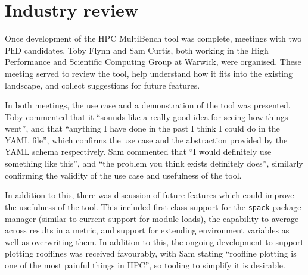 \section{Industry review}
\label{sec:hpc-multibench-industry-review}

Once development of the HPC MultiBench tool was complete, meetings with two PhD candidates, Toby Flynn and Sam Curtis, both working in the High Performance and Scientific Computing Group at Warwick, were organised. These meeting served to review the tool, help understand how it fits into the existing landscape, and collect suggestions for future features.

In both meetings, the use case and a demonstration of the tool was presented. Toby commented that it ``sounds like a really good idea for seeing how things went'', and that ``anything I have done in the past I think I could do in the YAML file'', which confirms the use case and the abstraction provided by the YAML schema respectively. Sam commented that ``I would definitely use something like this'', and ``the problem you think exists definitely does'', similarly confirming the validity of the use case and usefulness of the tool.

In addition to this, there was discussion of future features which could improve the usefulness of the tool. This included first-class support for the \texttt{spack} package manager (similar to current support for module loads), the capability to average across results in a metric, and support for extending environment variables as well as overwriting them. In addition to this, the ongoing development to support plotting rooflines was received favourably, with Sam stating ``roofline plotting is one of the most painful things in HPC'', so tooling to simplify it is desirable.
